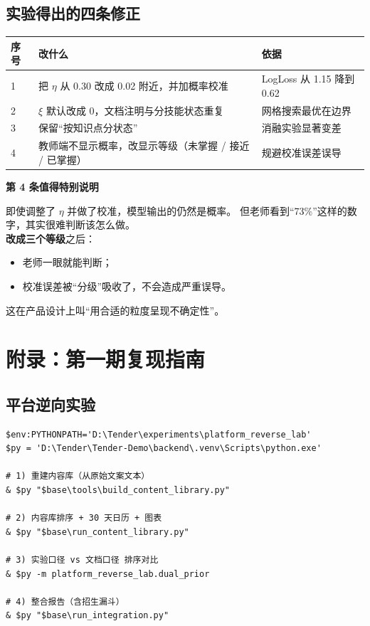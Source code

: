 \documentclass[UTF8,a4paper,11pt]{ctexart}
\newenvironment{explainbox}[1]
{\begin{center}\begin{minipage}{0.94\textwidth}\colorbox{boxbg}{\parbox{0.92\textwidth}{\textbf{#1}\par\vspace{2pt}}}}
{\end{minipage}\end{center}}
\begin{document}
\subsection{实验得出的四条修正}

\begin{longtable}{@{}p{1.0cm}p{6.4cm}p{6.2cm}@{}}
\toprule
\textbf{序号} & \textbf{改什么} & \textbf{依据} \\
\midrule
1 & 把 $\eta$ 从 0.30 改成 0.02 附近，并加概率校准 & LogLoss 从 1.15 降到 0.62 \\
2 & $\xi$ 默认改成 0，文档注明与分技能状态重复 & 网格搜索最优在边界 \\
3 & 保留“按知识点分状态” & 消融实验显著变差 \\
4 & 教师端不显示概率，改显示等级（未掌握 / 接近 / 已掌握） & 规避校准误差误导 \\
\bottomrule
\end{longtable}

\begin{explainbox}{第 4 条值得特别说明}
即使调整了 $\eta$ 并做了校准，模型输出的仍然是概率。
但老师看到“73\%”这样的数字，其实很难判断该怎么做。\\
\textbf{改成三个等级}之后：
\begin{itemize}[leftmargin=1.4em,itemsep=1pt]
\item 老师一眼就能判断；
\item 校准误差被“分级”吸收了，不会造成严重误导。
\end{itemize}
这在产品设计上叫“用合适的粒度呈现不确定性”。
\end{explainbox}

\newpage

\section{附录：第一期复现指南}

\subsection{平台逆向实验}

\begin{verbatim}
$env:PYTHONPATH='D:\Tender\experiments\platform_reverse_lab'
$py = 'D:\Tender\Tender-Demo\backend\.venv\Scripts\python.exe'

# 1) 重建内容库（从原始文案文本）
& $py "$base\tools\build_content_library.py"

# 2) 内容库排序 + 30 天日历 + 图表
& $py "$base\run_content_library.py"

# 3) 实验口径 vs 文档口径 排序对比
& $py -m platform_reverse_lab.dual_prior

# 4) 整合报告（含招生漏斗）
& $py "$base\run_integration.py"
\end{verbatim}
\end{document}
